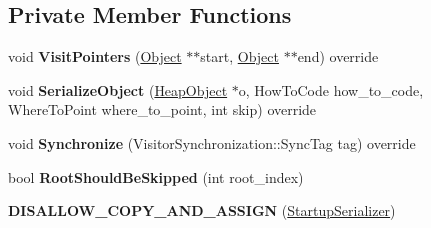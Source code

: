 \subsection*{Private Member Functions}
\begin{DoxyCompactItemize}
\item 
void {\bfseries Visit\+Pointers} (\hyperlink{classv8_1_1internal_1_1_object}{Object} $\ast$$\ast$start, \hyperlink{classv8_1_1internal_1_1_object}{Object} $\ast$$\ast$end) override\hypertarget{classv8_1_1internal_1_1_startup_serializer_a3a0a3c3a460be5cb4e2fef18636ce0c4}{}\label{classv8_1_1internal_1_1_startup_serializer_a3a0a3c3a460be5cb4e2fef18636ce0c4}

\item 
void {\bfseries Serialize\+Object} (\hyperlink{classv8_1_1internal_1_1_heap_object}{Heap\+Object} $\ast$o, How\+To\+Code how\+\_\+to\+\_\+code, Where\+To\+Point where\+\_\+to\+\_\+point, int skip) override\hypertarget{classv8_1_1internal_1_1_startup_serializer_a37f4bacc15f9b04bdf9deb6b3a6d7b37}{}\label{classv8_1_1internal_1_1_startup_serializer_a37f4bacc15f9b04bdf9deb6b3a6d7b37}

\item 
void {\bfseries Synchronize} (Visitor\+Synchronization\+::\+Sync\+Tag tag) override\hypertarget{classv8_1_1internal_1_1_startup_serializer_a0d7c43a9ba2e8fe2c28db75381338528}{}\label{classv8_1_1internal_1_1_startup_serializer_a0d7c43a9ba2e8fe2c28db75381338528}

\item 
bool {\bfseries Root\+Should\+Be\+Skipped} (int root\+\_\+index)\hypertarget{classv8_1_1internal_1_1_startup_serializer_a266413bb89240ac59ff9613468995de0}{}\label{classv8_1_1internal_1_1_startup_serializer_a266413bb89240ac59ff9613468995de0}

\item 
{\bfseries D\+I\+S\+A\+L\+L\+O\+W\+\_\+\+C\+O\+P\+Y\+\_\+\+A\+N\+D\+\_\+\+A\+S\+S\+I\+GN} (\hyperlink{classv8_1_1internal_1_1_startup_serializer}{Startup\+Serializer})\hypertarget{classv8_1_1internal_1_1_startup_serializer_a0277ab3cb3230e3213ae31ca15c13339}{}\label{classv8_1_1internal_1_1_startup_serializer_a0277ab3cb3230e3213ae31ca15c13339}

\end{DoxyCompactItemize}
